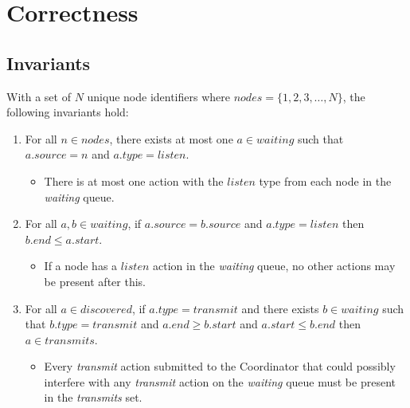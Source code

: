 \section{Correctness}

\subsection{Invariants}\label{sec:coordinator-invariants}

With a set of $N$ unique node identifiers where $\mathit{nodes} = \{ 1, 2, 3, \ldots, N \}$, the following
invariants hold:

\begin{enumerate}
    \item For all $n \in \mathit{nodes}$, there exists at most one $a \in \mathit{waiting}$ such that
          $a.\mathit{source} = n$ and $a.\mathit{type} = \mathit{listen}$.
          \begin{itemize}
              \item There is at most one action with the $\mathit{listen}$ type from each node in the
                    \textit{waiting} queue.
          \end{itemize}
    \item For all $a, b \in \mathit{waiting}$, if $a.\mathit{source} = b.\mathit{source}$ and $a.\mathit{type}
              = \mathit{listen}$ then $b.\mathit{end} \leq a.\mathit{start}$.
          \begin{itemize}
              \item If a node has a $\mathit{listen}$ action in the \textit{waiting} queue, no other actions
                    may be present after this.
          \end{itemize}
    \item For all $a \in \mathit{discovered}$, if $a.\mathit{type} = \mathit{transmit}$ and there exists $b
              \in \mathit{waiting}$ such that $b.\mathit{type} = \mathit{transmit}$ and $a.\mathit{end} \geq
              b.\mathit{start}$ and $a.\mathit{start} \leq b.\mathit{end}$ then $a \in \mathit{transmits}$.
          \begin{itemize}
              \item Every \textit{transmit} action submitted to the Coordinator that could possibly interfere
                    with any \textit{transmit} action on the \textit{waiting} queue must be present in the
                    \textit{transmits} set.
          \end{itemize}
\end{enumerate}

